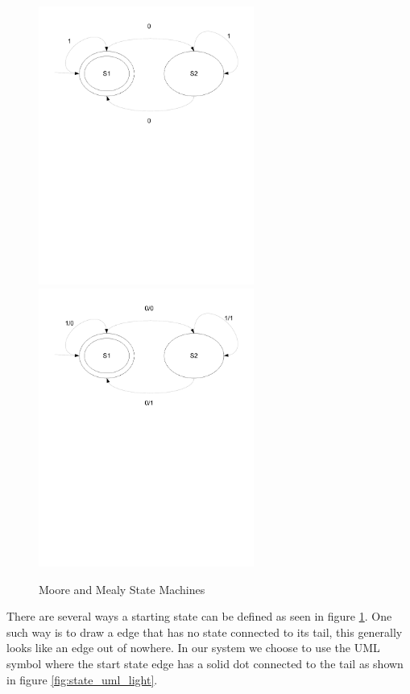 \begin{figure}[htp]
    \centering
    \includegraphics[trim= 15mm 150mm 15mm 10mm, clip, width=200pt]{./images/state_moore.pdf} 
    \includegraphics[trim= 15mm 150mm 15mm 10mm, clip, width=200pt]{./images/state_mealy.pdf}    
    \caption{Moore and Mealy State Machines}
    \label{fig:state_moore_mealy}
\end{figure}

There are several ways a starting state can be defined as seen in figure \ref{fig:state_moore_mealy}.
One such way is to draw a edge that has no state connected to its tail, this generally looks like an edge out of nowhere. In our system we choose to use the UML symbol where the start state edge has a solid dot connected to the tail as shown in figure \ref{fig:state_uml_light}.

